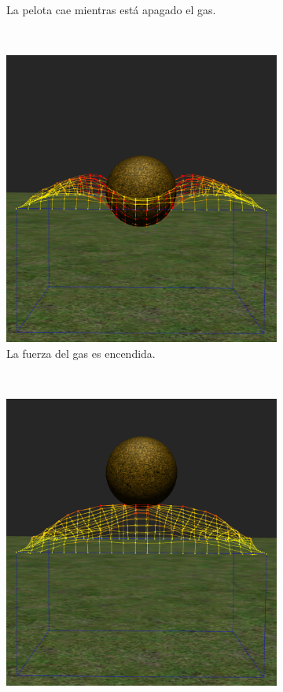 \begin{figure}
\begin{subfigure}[b]{0.45\textwidth}
    \caption{La pelota cae mientras está apagado el gas.}
    \label{pres:test2}
  \end{subfigure}
\\
  \begin{subfigure}[b]{0.45\textwidth}
    \includegraphics[width=\textwidth]{img/04/modPress3}
    \caption{La fuerza del gas es encendida.}
    \label{pres:test3}
  \end{subfigure}
~
  \begin{subfigure}[b]{0.45\textwidth}
    \includegraphics[width=\textwidth]{img/04/modPress4}

\end{subfigure}
\end{figure}
